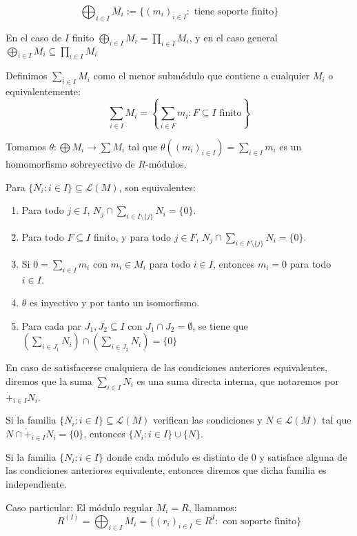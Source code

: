 \begin{df}
  \[
    \bigoplus_{i\in I} M_i:=\{{(m_i)}_{i\in I}: \textrm{ tiene soporte
    finito}\}
  \]
\end{df}


En el caso de \(I\) finito \(\bigoplus_{i\in I} M_i=\prod_{i\in I} M_i\),
y en el caso general \(\bigoplus_{i\in I} M_i\subseteq\prod_{i\in I} M_i\)

\begin{df}
  Definimos \(\sum_{i\in I} M_i\) como el menor submódulo que contiene
  a cualquier \(M_i\) o equivalentemente:
  \[
    \sum_{i\in I} M_i=\left\{\sum_{i\in F} m_i: F\subseteq I \textrm{ finito}\right\}
  \]
\end{df}

\begin{prop}
  Tomamos \(\theta:\bigoplus M_i\longrightarrow \sum M_i\) tal que
  \(\theta({(m_i)}_{i\in I})=\sum_{i\in I} m_i\) es un homomorfismo
  sobreyectivo de \(R\)-módulos.

  Para \(\{N_i:i\in I\}\subseteq\mathcal{L}(M)\), son equivalentes:
  \begin{enumerate}
    \item Para todo \(j\in I\), \(N_j\cap\sum_{i\in I\setminus\{j\}} N_i
      =\{0\}\).
    \item Para todo \(F\subseteq I\) finito, y para todo \(j\in F\),
      \(N_j\cap\sum_{i\in F\setminus\{j\}} N_i
      =\{0\}\).
    \item Si \(0=\sum_{i\in I} m_i\) con \(m_i\in M_i\) para todo
      \(i\in I\), entonces \(m_i=0\) para todo \(i\in I\).
    \item \(\theta\) es inyectivo y por tanto un isomorfismo.
    \item Para cada par \(J_1,J_2\subseteq I\) con
      \(J_1\cap J_2=\emptyset\), se tiene que
      \(\left(\sum_{i\in J_1} N_i\right)\cap
      \left(\sum_{i\in J_2} N_i\right)=\{0\}\)
  \end{enumerate}
\end{prop}

\begin{df}
  En caso de satisfacerse cualquiera de las condiciones anteriores
  equivalentes, diremos que la suma \(\sum_{i\in I} N_i\) es una suma
  directa interna, que notaremos por \(\dot{+}_{i\in I} N_i\).
\end{df}

\begin{cor}
  Si la familia \(\{N_i:i\in I\}\subseteq\mathcal{L}(M)\) verifican
  las condiciones y \(N\in\mathcal{L}(M)\) tal que
  \(N\cap\dot{+}_{i\in I} N_i=\{0\}\), entonces \(\{N_i:i\in I\}\cup\{N\}\).
\end{cor}

\begin{df}[Independencia]
  Si la familia \(\{N_i:i\in I\}\) donde cada módulo es distinto de 0 y
  satisface alguna de las condiciones anteriores equivalente, entonces
  diremos que dicha familia es independiente.
\end{df}

Caso particular: El módulo regular \(M_i=R\), llamamos:
\[
  R^{(I)}=\bigoplus_{i\in I} M_i=\{
    {(r_i)}_{i\in I}\in R^I:\textrm{ con soporte finito}\}
\]

